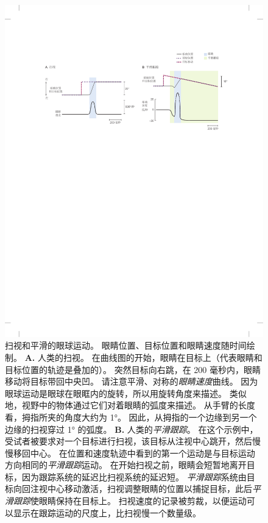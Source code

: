 \begin{figure}[htbp]
	\centering
	\includegraphics[width=1.0\linewidth]{chap35/fig_35_6}
	\caption{扫视和平滑的眼球运动。
		眼睛位置、目标位置和眼睛速度随时间绘制。
		\textbf{A.} 人类的扫视。
		在曲线图的开始，眼睛在目标上（代表眼睛和目标位置的轨迹是叠加的）。
		突然目标向右跳，在 200 毫秒内，眼睛移动将目标带回中央凹。
		请注意平滑、对称的\textit{眼睛速度}曲线。
		因为眼球运动是眼球在眼眶内的旋转，所以用旋转角度来描述。
		类似地，视野中的物体通过它们对着眼睛的弧度来描述。
		从手臂的长度看，拇指所夹的角度大约为 1°。
		因此，从拇指的一个边缘到另一个边缘的扫视穿过 1° 的弧度。
		\textbf{B.} 人类的\textit{平滑跟踪}。
		在这个示例中，受试者被要求对一个目标进行扫视，该目标从注视中心跳开，然后慢慢移回中心。
		在位置和速度轨迹中看到的第一个运动是与目标运动方向相同的\textit{平滑跟踪}运动。
		在开始扫视之前，眼睛会短暂地离开目标，因为跟踪系统的延迟比扫视系统的延迟短。
		\textit{平滑跟踪}系统由目标向回注视中心移动激活，扫视调整眼睛的位置以捕捉目标，此后\textit{平滑跟踪}使眼睛保持在目标上。
		扫视速度的记录被剪裁，以便运动可以显示在跟踪运动的尺度上，比扫视慢一个数量级。}
	\label{fig:35_6}
\end{figure}


